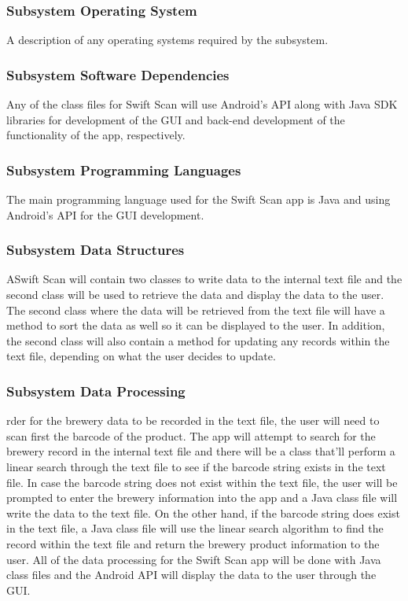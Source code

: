 \subsubsection{Subsystem Operating System}
A description of any operating systems required by the subsystem.

\subsubsection{Subsystem Software Dependencies}
Any of the class files for Swift Scan will use Android's API along with Java SDK libraries for development of the GUI and back-end development of the functionality of the app, respectively.

\subsubsection{Subsystem Programming Languages}
The main programming language used for the Swift Scan app is Java and using Android's API for the GUI development.

\subsubsection{Subsystem Data Structures}
ASwift Scan will contain two classes to write data to the internal text file and the second class will be used to retrieve the data and display the data to the user.  The second class where the data will be retrieved from the text file will have a method to sort the data as well so it can be displayed to the user.  In addition, the second class will also contain a method for updating any records within the text file, depending on what the user decides to update.

\subsubsection{Subsystem Data Processing}
rder for the brewery data to be recorded in the text file, the user will need to scan first the barcode of the product.  The app will attempt to search for the brewery record in the internal text file and there will be a class that'll perform a linear search through the text file to see if the barcode string exists in the text file.  In case the barcode string does not exist within the text file, the user will be prompted to enter the brewery information into the app and a Java class file will write the data to the text file.  On the other hand, if the barcode string does exist in the text file, a Java class file will use the linear search algorithm to find the record within the text file and return the brewery product information to the user.  All of the data processing for the Swift Scan app will be done with Java class files and the Android API will display the data to the user through the GUI.
